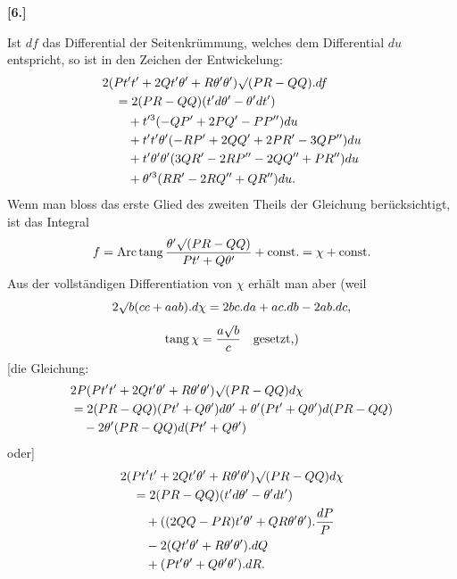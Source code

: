 %
\begin{center}\bfseries [6.]\end{center}
\noindent\hspace*{1.2em}Ist $df$ das Differential der Seitenkrümmung, welches dem Differential $du$ entspricht, so ist in den Zeichen der Entwickelung:
\[
\begin{aligned}
&2(Pt't'+2Qt'\theta'+R\theta'\theta')\mathord{\surd}(PR-QQ).df\\
&\quad=2(PR-QQ)(t'd\theta'-\theta'dt')\\
&\qquad+t'^3(-QP'+2PQ'-PP'')du\\
&\qquad+t't'\theta'(-RP'+2QQ'+2PR'-3QP'')du\\
&\qquad+t'\theta'\theta'(3QR'-2RP''-2QQ''+PR'')du\\
&\qquad+\theta'^3(RR'-2RQ''+QR'')du.
\end{aligned}
\]
Wenn man bloss das erste Glied des zweiten Theils der Gleichung berücksichtigt, ist das Integral
\[
f=\operatorname{Arc\,tang}\frac{\theta'\mathord{\surd}(PR-QQ)}{Pt'+Q\theta'}+\text{const.}=\chi+\text{const.}
\]
Aus der vollständigen Differentiation von $\chi$ erhält man aber (weil
\[
2\mathord{\surd}b(cc+aab).d\chi=2bc.da+ac.db-2ab.dc,
\]
\[
\operatorname{tang}\chi=\frac{a\mathord{\surd}b}{c}\quad\text{gesetzt,)}
\]
[die Gleichung:
\[
\begin{aligned}
&2P(Pt't'+2Qt'\theta'+R\theta'\theta')\mathord{\surd}(PR-QQ)d\chi\\
&=2(PR-QQ)(Pt'+Q\theta')d\theta'+\theta'(Pt'+Q\theta')d(PR-QQ)\\
&\quad-2\theta'(PR-QQ)d(Pt'+Q\theta')
\end{aligned}
\]
oder]
\[
\begin{aligned}
&2(Pt't'+2Qt'\theta'+R\theta'\theta')\mathord{\surd}(PR-QQ)d\chi\\
&\quad=2(PR-QQ)(t'd\theta'-\theta'dt')\\
&\qquad+((2QQ-PR)t'\theta'+QR\theta'\theta').\frac{dP}{P}\\
&\qquad-2(Qt'\theta'+R\theta'\theta').dQ\\
&\qquad+(Pt'\theta'+Q\theta'\theta').dR.
\end{aligned}
\]
